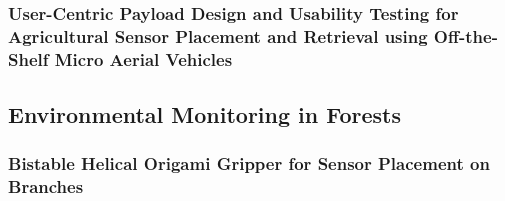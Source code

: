 \subsubsection{User-Centric Payload Design and Usability Testing for Agricultural Sensor Placement and Retrieval using Off-the-Shelf Micro Aerial Vehicles \cite{Geckeler2024a}}


\subsection{Environmental Monitoring in Forests}

\subsubsection{Bistable Helical Origami Gripper for Sensor Placement on Branches \cite{Geckeler2022a}}



